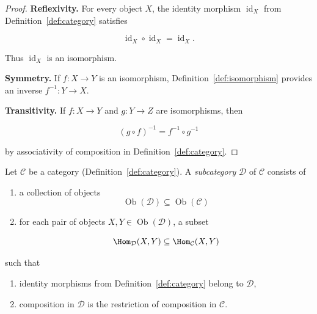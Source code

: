 \begin{proof}

\textbf{Reflexivity.}  
For every object $X$, the identity morphism $\operatorname{id}_X$ from
Definition~\ref{def:category} satisfies

$$
\operatorname{id}_X \circ \operatorname{id}_X = \operatorname{id}_X.
$$

Thus $\operatorname{id}_X$ is an isomorphism.

\textbf{Symmetry.}  
If $f : X \to Y$ is an isomorphism, Definition~\ref{def:isomorphism}
provides an inverse $f^{-1} : Y \to X$.

\textbf{Transitivity.}  
If $f : X \to Y$ and $g : Y \to Z$ are isomorphisms, then

$$
(g \circ f)^{-1} = f^{-1} \circ g^{-1}
$$

by associativity of composition in Definition~\ref{def:category}.
\end{proof}


\begin{definition}[Subcategory]
\label{def:subcategory}

Let $\mathcal{C}$ be a category (Definition~\ref{def:category}).  
A \emph{subcategory} $\mathcal{D}$ of $\mathcal{C}$ consists of

\begin{enumerate}

\item a collection of objects
$$
\operatorname{Ob}(\mathcal{D}) \subseteq \operatorname{Ob}(\mathcal{C})
$$

\item for each pair of objects $X,Y \in \operatorname{Ob}(\mathcal{D})$,
a subset

$$
\Hom_{\mathcal{D}}(X,Y)
\subseteq
\Hom_{\mathcal{C}}(X,Y)
$$

\end{enumerate}

such that

\begin{enumerate}

\item identity morphisms from Definition~\ref{def:category} belong to
$\mathcal{D}$,

\item composition in $\mathcal{D}$ is the restriction of composition in
$\mathcal{C}$.

\end{enumerate}

\end{definition}


